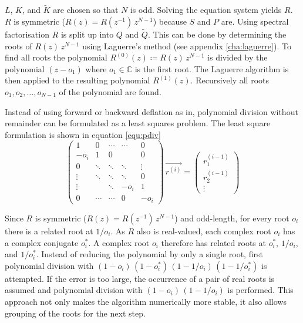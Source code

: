 \documentclass[a4paper,12pt]{book}
\begin{document}
$L$, $K$, and $\widetilde{K}$ are chosen so that $N$ is odd.
Solving the equation system yields $R$. $R$ is symmetric
($R(z)=R(z^{-1})\,z^{N-1}$) because $S$ and $P$
are. Using spectral factorisation $R$ is split up into $Q$ and $\widetilde{Q}$.
This can be done by determining the roots of $R(z)\,z^{N-1}$ using Laguerre's
method (see appendix \ref{cha:laguerre}).
To find all roots the polynomial $R^{(0)}(z)\coloneqq R(z)\,z^{N-1}$ is divided
by the polynomial $(z-o_1)$ where $o_1\in\mathbb{C}$ is the first root. The
Laguerre algorithm is then applied to the resulting polynomial $R^{(1)}(z)$.
Recursively all roots $o_1,o_2,\ldots,o_{N-1}$ of the polynomial are found.

Instead of using forward or backward deflation as in\cite{Refworks:406},
polynomial division without remainder can be formulated as a least squares
prob\-lem\cite{Refworks:416}. The least square formulation is shown in
equation \ref{equ:pdiv}
\begin{equation}\label{equ:pdiv}
  \begin{pmatrix}
    1      & 0      & \cdots & \cdots & 0     \\
    -o_i   & 1      & 0      &        & 0     \\
    0      & \ddots & \ddots & \ddots & \vdots\\
    \vdots & \ddots & \ddots & \ddots & 0     \\
    \vdots &        & \ddots & -o_i   & 1     \\
    0      & \cdots & \cdots & 0      & -o_i
  \end{pmatrix}\,
  \vec{r^{(i)}}=
  \begin{pmatrix}
    r^{(i-1)}_1   \\
    r^{(i-1)}_2   \\
    \vdots
  \end{pmatrix}
\end{equation}

Since $R$ is symmetric ($R(z)=R(z^{-1})\,z^{N-1}$) and odd-length, for every
root $o_i$ there is a related root at $1/o_i$. As $R$ also is real-valued,
each complex root $o_i$ has a complex conjugate $o^*_i$. A complex root
$o_i$ therefore has related roots at $o_i^*$, $1/o_i$, and $1/o_i^*$.
Instead of reducing the polynomial by only a single root, first polynomial
division with $(1-o_i)\,(1-o^*_i)\,(1-1/o_i)\,(1-1/o^*_i)$ is attempted. If
the error is too large, the occurrence of a pair of real roots is assumed and
polynomial division with $(1-o_i)\,(1-1/o_i)$ is performed. This approach
not only makes the algorithm numerically more stable, it also allows grouping
of the roots for the next step.
\end{document}

